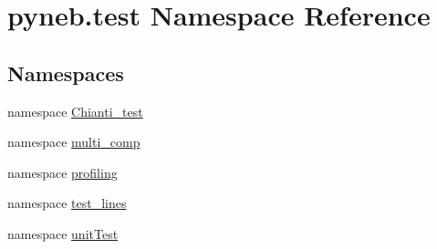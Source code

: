 \hypertarget{namespacepyneb_1_1test}{\section{pyneb.\-test Namespace Reference}
\label{namespacepyneb_1_1test}
}
\subsection*{Namespaces}
\begin{DoxyCompactItemize}
\item 
namespace \hyperlink{namespacepyneb_1_1test_1_1_chianti__test}{Chianti\-\_\-test}
\item 
namespace \hyperlink{namespacepyneb_1_1test_1_1multi__comp}{multi\-\_\-comp}
\item 
namespace \hyperlink{namespacepyneb_1_1test_1_1profiling}{profiling}
\item 
namespace \hyperlink{namespacepyneb_1_1test_1_1test__lines}{test\-\_\-lines}
\item 
namespace \hyperlink{namespacepyneb_1_1test_1_1unit_test}{unit\-Test}
\end{DoxyCompactItemize}
